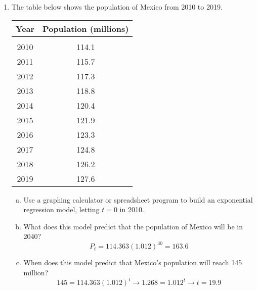 \begin{enumerate}
\item The table below shows the population of Mexico from 2010 to 2019.
\begin{center}
\begin{tabular}{c c}
\textbf{Year} & \textbf{Population (millions)}\\
\hline
 & \\
2010 & 114.1\\
2011 & 115.7\\
2012 & 117.3\\
2013 & 118.8\\
2014 & 120.4\\
2015 & 121.9\\
2016 & 123.3\\
2017 & 124.8\\
2018 & 126.2\\
2019 & 127.6
\end{tabular}
\end{center}
\begin{enumerate}[(a)]
\item Use a graphing calculator or spreadsheet program to build an exponential regression model, letting $t=0$ in 2010. 
\item What does this model predict that the population of Mexico will be in 2040? 
\[P_t = 114.363(1.012)^{30} = 163.6\]
\item When does this model predict that Mexico's population will reach 145 million? 
\[145 = 114.363(1.012)^t \longrightarrow 1.268 = 1.012^t \longrightarrow t = 19.9\]
\end{enumerate}
\end{enumerate}